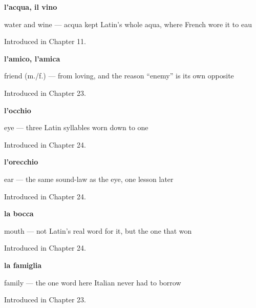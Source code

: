 \noindent\begin{minipage}[t]{\linewidth}
\raggedright
\textbf{l'acqua, il vino}\par
\small water and wine — acqua kept Latin's whole aqua, where French wore it to eau\par
\footnotesize Introduced in Chapter 11.
\end{minipage}\par\medskip

\noindent\begin{minipage}[t]{\linewidth}
\raggedright
\textbf{l'amico, l'amica}\par
\small friend (m./f.) — from loving, and the reason \textquotedblleft{}enemy\textquotedblright{} is its own opposite\par
\footnotesize Introduced in Chapter 23.
\end{minipage}\par\medskip

\noindent\begin{minipage}[t]{\linewidth}
\raggedright
\textbf{l'occhio}\par
\small eye — three Latin syllables worn down to one\par
\footnotesize Introduced in Chapter 24.
\end{minipage}\par\medskip

\noindent\begin{minipage}[t]{\linewidth}
\raggedright
\textbf{l'orecchio}\par
\small ear — the same sound-law as the eye, one lesson later\par
\footnotesize Introduced in Chapter 24.
\end{minipage}\par\medskip

\noindent\begin{minipage}[t]{\linewidth}
\raggedright
\textbf{la bocca}\par
\small mouth — not Latin's real word for it, but the one that won\par
\footnotesize Introduced in Chapter 24.
\end{minipage}\par\medskip

\noindent\begin{minipage}[t]{\linewidth}
\raggedright
\textbf{la famiglia}\par
\small family — the one word here Italian never had to borrow\par
\footnotesize Introduced in Chapter 23.
\end{minipage}\par\medskip

